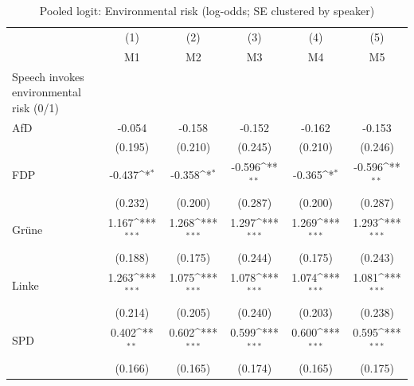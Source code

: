 \begin{table}[htbp]\centering
\def\sym#1{\ifmmode^{#1}\else\(^{#1}\)\fi}
\caption{Pooled logit: Environmental risk (log-odds; SE clustered by speaker)}
\begin{tabular}{l*{5}{c}}
\toprule
                    &\multicolumn{1}{c}{(1)}&\multicolumn{1}{c}{(2)}&\multicolumn{1}{c}{(3)}&\multicolumn{1}{c}{(4)}&\multicolumn{1}{c}{(5)}\\
                    &\multicolumn{1}{c}{M1}&\multicolumn{1}{c}{M2}&\multicolumn{1}{c}{M3}&\multicolumn{1}{c}{M4}&\multicolumn{1}{c}{M5}\\
\midrule
Speech invokes environmental risk (0/1)&                     &                     &                     &                     &                     \\
AfD                 &      -0.054         &      -0.158         &      -0.152         &      -0.162         &      -0.153         \\
                    &     (0.195)         &     (0.210)         &     (0.245)         &     (0.210)         &     (0.246)         \\
\addlinespace
FDP                 &      -0.437\sym{*}  &      -0.358\sym{*}  &      -0.596\sym{**} &      -0.365\sym{*}  &      -0.596\sym{**} \\
                    &     (0.232)         &     (0.200)         &     (0.287)         &     (0.200)         &     (0.287)         \\
\addlinespace
Grüne               &       1.167\sym{***}&       1.268\sym{***}&       1.297\sym{***}&       1.269\sym{***}&       1.293\sym{***}\\
                    &     (0.188)         &     (0.175)         &     (0.244)         &     (0.175)         &     (0.243)         \\
\addlinespace
Linke               &       1.263\sym{***}&       1.075\sym{***}&       1.078\sym{***}&       1.074\sym{***}&       1.081\sym{***}\\
                    &     (0.214)         &     (0.205)         &     (0.240)         &     (0.203)         &     (0.238)         \\
\addlinespace
SPD                 &       0.402\sym{**} &       0.602\sym{***}&       0.599\sym{***}&       0.600\sym{***}&       0.595\sym{***}\\
                    &     (0.166)         &     (0.165)         &     (0.174)         &     (0.165)         &     (0.175)         \\

\end{tabular}
\end{table}
